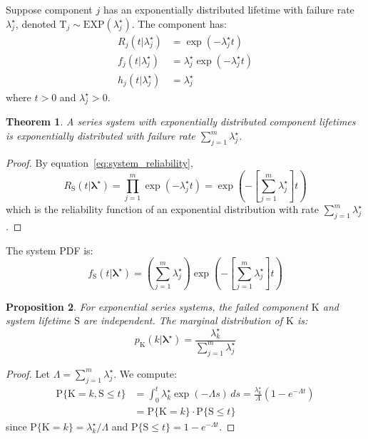 \documentclass[12pt]{article}
\newcommand{\RV}[1]{\mathrm{#1}}
\newcommand{\Prob}[1]{\mathrm{P}\{#1\}}
\newcommand{\cv}{\RV{T}}           %
\newcommand{\sv}{\RV{S}}           %
\newcommand{\tparam}[1]{{#1}^{\star}}  %
\newcommand{\pdf}{f}
\newcommand{\pmf}{p}
\newcommand{\srv}{R}
\newcommand{\haz}{h}
\newcommand{\spdf}{\pdf_{\sv}}
\newcommand{\expdist}{\mathrm{EXP}}
\renewcommand{\vec}[1]{\boldsymbol{#1}}
\newtheorem{theorem}{Theorem}[section]
\newtheorem{proposition}[theorem]{Proposition}
\theoremstyle{definition}
\theoremstyle{remark}
\begin{document}
Suppose component $j$ has an exponentially distributed lifetime with failure rate $\tparam{\lambda}_j$, denoted $\cv_j \sim \expdist(\tparam{\lambda}_j)$. The component has:
\begin{align}
\label{eq:expo_reliability}
\srv_j(t | \tparam{\lambda}_j) &= \exp(-\tparam{\lambda}_j t)\\
\label{eq:expo_pdf}
\pdf_j(t | \tparam{\lambda}_j) &= \tparam{\lambda}_j \exp(-\tparam{\lambda}_j t)\\
\label{eq:expo_hazard}
\haz_j(t | \tparam{\lambda}_j) &= \tparam{\lambda}_j
\end{align}
where $t > 0$ and $\tparam{\lambda}_j > 0$.

\begin{theorem}
\label{thm:expo_system}
A series system with exponentially distributed component lifetimes is exponentially distributed with failure rate $\sum_{j=1}^{m} \tparam{\lambda}_j$.
\end{theorem}

\begin{proof}
By equation~\eqref{eq:system_reliability},
\begin{equation}
\srv_{\sv}(t | \tparam{\vec{\lambda}}) = \prod_{j=1}^{m} \exp(-\tparam{\lambda}_j t) = \exp\left(-\left[\sum_{j=1}^{m} \tparam{\lambda}_j\right] t\right)
\end{equation}
which is the reliability function of an exponential distribution with rate $\sum_{j=1}^{m} \tparam{\lambda}_j$.
\end{proof}

The system PDF is:
\begin{equation}
\label{eq:expo_system_pdf}
\spdf(t | \tparam{\vec{\lambda}}) = \left(\sum_{j=1}^{m} \tparam{\lambda}_j\right) \exp\left(-\left[\sum_{j=1}^{m} \tparam{\lambda}_j\right] t\right)
\end{equation}

\begin{proposition}
\label{prop:expo_K_indep_S}
For exponential series systems, the failed component $\RV{K}$ and system lifetime $\sv$ are independent. The marginal distribution of $\RV{K}$ is:
\begin{equation}
\label{eq:expo_K_indep_S}
\pmf_{\RV{K}}(k | \tparam{\vec{\lambda}}) = \frac{\tparam{\lambda}_k}{\sum_{j=1}^{m} \tparam{\lambda}_j}
\end{equation}
\end{proposition}

\begin{proof}
Let $\Lambda = \sum_{j=1}^{m} \tparam{\lambda}_j$. We compute:
\begin{align}
\Prob{\RV{K} = k, \sv \leq t} &= \int_0^t \tparam{\lambda}_k \exp(-\Lambda s) \, ds = \frac{\tparam{\lambda}_k}{\Lambda}\left(1 - e^{-\Lambda t}\right) \nonumber\\
&= \Prob{\RV{K} = k} \cdot \Prob{\sv \leq t}
\end{align}
since $\Prob{\RV{K} = k} = \tparam{\lambda}_k/\Lambda$ and $\Prob{\sv \leq t} = 1 - e^{-\Lambda t}$.
\end{proof}
\end{document}
